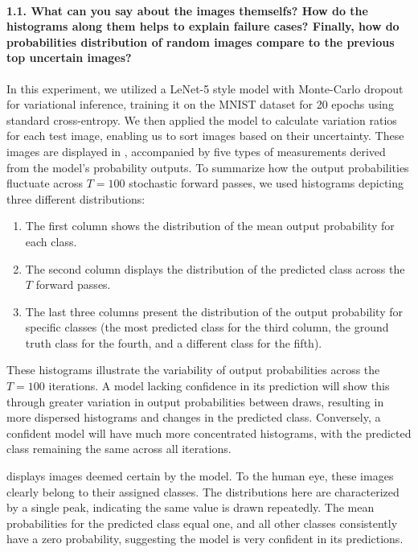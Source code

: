 \paragraph*{1.1. What can you say about the images themselfs? How do the histograms along them helps to explain failure cases? Finally, how do probabilities distribution of random images compare to the previous top uncertain images?}
In this experiment, we utilized a LeNet-5 style model with Monte-Carlo dropout for variational inference, training it on the MNIST dataset for 20 epochs using standard cross-entropy. We then applied the model to calculate variation ratios for each test image, enabling us to sort images based on their uncertainty. These images are displayed in , accompanied by five types of measurements derived from the model's probability outputs. To summarize how the output probabilities fluctuate across $ T=100 $ stochastic forward passes, we used histograms depicting three different distributions:
\begin{enumerate}
    \item The first column shows the distribution of the mean output probability for each class.
    \item The second column displays the distribution of the predicted class across the $ T $ forward passes.
    \item The last three columns present the distribution of the output probability for specific classes (the most predicted class for the third column, the ground truth class for the fourth, and a different class for the fifth).
\end{enumerate}
These histograms illustrate the variability of output probabilities across the $ T=100 $ iterations. A model lacking confidence in its prediction will show this through greater variation in output probabilities between draws, resulting in more dispersed histograms and changes in the predicted class. Conversely, a confident model will have much more concentrated histograms, with the predicted class remaining the same across all iterations.

 displays images deemed certain by the model. To the human eye, these images clearly belong to their assigned classes. The distributions here are characterized by a single peak, indicating the same value is drawn repeatedly. The mean probabilities for the predicted class equal one, and all other classes consistently have a zero probability, suggesting the model is very confident in its predictions.

